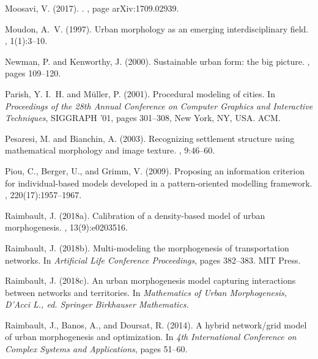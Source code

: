 \documentclass[letterpaper]{article}
\begin{document}
\begin{thebibliography}{}
{Moosavi}, V. (2017).
.
, page arXiv:1709.02939.

Moudon, A.~V. (1997).
\newblock Urban morphology as an emerging interdisciplinary field.
, 1(1):3--10.

Newman, P. and Kenworthy, J. (2000).
\newblock Sustainable urban form: the big picture.
, pages 109--120.

Parish, Y. I.~H. and M\"{u}ller, P. (2001).
\newblock Procedural modeling of cities.
\newblock In {\em Proceedings of the 28th Annual Conference on Computer
  Graphics and Interactive Techniques}, SIGGRAPH '01, pages 301--308, New York,
  NY, USA. ACM.

Pesaresi, M. and Bianchin, A. (2003).
\newblock Recognizing settlement structure using mathematical morphology and
  image texture.
, 9:46--60.

Piou, C., Berger, U., and Grimm, V. (2009).
\newblock Proposing an information criterion for individual-based models
  developed in a pattern-oriented modelling framework.
, 220(17):1957--1967.

Raimbault, J. (2018a).
\newblock Calibration of a density-based model of urban morphogenesis.
, 13(9):e0203516.

Raimbault, J. (2018b).
\newblock Multi-modeling the morphogenesis of transportation networks.
\newblock In {\em Artificial Life Conference Proceedings}, pages 382--383. MIT
  Press.

Raimbault, J. (2018c).
\newblock An urban morphogenesis model capturing interactions between networks
  and territories.
\newblock In {\em Mathematics of Urban Morphogenesis, D'Acci L., ed. Springer
  Birkhauser Mathematics.}

Raimbault, J., Banos, A., and Doursat, R. (2014).
\newblock A hybrid network/grid model of urban morphogenesis and optimization.
\newblock In {\em 4th International Conference on Complex Systems and
  Applications}, pages 51--60.


\end{thebibliography}
\end{document}
